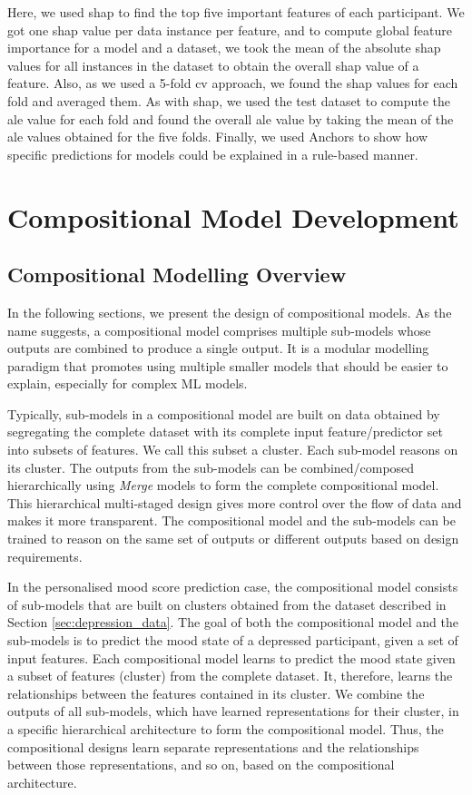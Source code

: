 Here, we used \gls{shap} to find the top five important features of each participant. We got one \gls{shap} value per data instance per feature, and to compute global feature importance for a model and a dataset, we took the mean of the absolute \gls{shap} values for all instances in the dataset to obtain the overall \gls{shap} value of a feature. Also, as we used a 5-fold \gls{cv} approach, we found the \gls{shap} values for each fold and averaged them. As with \gls{shap}, we used the test dataset to compute the \gls{ale} value for each fold and found the overall \gls{ale} value by taking the mean of the \gls{ale} values obtained for the five folds. Finally, we used Anchors to show how specific predictions for models could be explained in a rule-based manner.


\section{Compositional Model Development}
\label{sec:compositional_model_development}


\subsection{Compositional Modelling Overview}

In the following sections, we present the design of compositional models. As the name suggests, a compositional model comprises multiple sub-models whose outputs are combined to produce a single output. It is a modular modelling paradigm that promotes using multiple smaller models that should be easier to explain, especially for complex ML models. 

Typically, sub-models in a compositional model are built on data obtained by segregating the complete dataset with its complete input feature/predictor set into subsets of features. We call this subset a cluster. Each sub-model reasons on its cluster. The outputs from the sub-models can be combined/composed hierarchically using \emph{Merge} models to form the complete compositional model. This hierarchical multi-staged design gives more control over the flow of data and makes it more transparent. The compositional model and the sub-models can be trained to reason on the same set of outputs or different outputs based on design requirements. 

In the personalised mood score prediction case, the compositional model consists of sub-models that are built on clusters obtained from the dataset described in Section \ref{sec:depression_data}. The goal of both the compositional model and the sub-models is to predict the mood state of a depressed participant, given a set of input features. Each compositional model learns to predict the mood state given a subset of features (cluster) from the complete dataset. It, therefore, learns the relationships between the features contained in its cluster. We combine the outputs of all sub-models, which have learned representations for their cluster, in a specific hierarchical architecture to form the compositional model. Thus, the compositional designs learn separate representations and the relationships between those representations, and so on, based on the compositional architecture.

